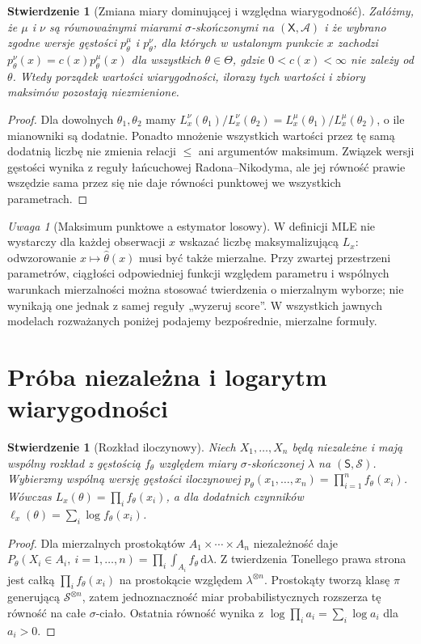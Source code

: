 \documentclass[11pt,a4paper,oneside]{report}
\numberwithin{equation}{chapter}
\theoremstyle{plain}
\newtheorem{stwierdzenie}[twierdzenie]{Stwierdzenie}
\theoremstyle{definition}
\theoremstyle{remark}
\newtheorem{uwaga}{Uwaga}[chapter]
\newcommand{\calA}{\mathcal A}
\newcommand{\dd}{\mathrm d}
\begin{document}
\begin{stwierdzenie}[Zmiana miary dominującej i względna wiarygodność]\label{prop:change-reference}
Załóżmy, że $\mu$ i $\nu$ są równoważnymi miarami $\sigma$-skończonymi na
$(\mathsf X,\calA)$ i że wybrano zgodne wersje gęstości $p_\theta^\mu$
i $p_\theta^\nu$, dla których w ustalonym punkcie $x$ zachodzi
$p_\theta^\nu(x)=c(x)p_\theta^\mu(x)$ dla wszystkich $\theta\in\Theta$,
gdzie $0<c(x)<\infty$ nie zależy od $\theta$. Wtedy porządek wartości
wiarygodności, ilorazy tych wartości i zbiory maksimów pozostają niezmienione.
\end{stwierdzenie}
\begin{proof}
Dla dowolnych $\theta_1,\theta_2$ mamy
$L_x^\nu(\theta_1)/L_x^\nu(\theta_2)
=L_x^\mu(\theta_1)/L_x^\mu(\theta_2)$, o ile mianowniki są dodatnie.
Ponadto mnożenie wszystkich wartości przez tę samą dodatnią liczbę nie
zmienia relacji $\le$ ani argumentów maksimum. Związek wersji gęstości
wynika z reguły łańcuchowej Radona--Nikodyma, ale jej równość prawie
wszędzie sama przez się nie daje równości punktowej we wszystkich parametrach.
\end{proof}


\begin{uwaga}[Maksimum punktowe a estymator losowy]
W definicji MLE nie wystarczy dla każdej obserwacji $x$ wskazać
liczbę maksymalizującą $L_x$: odwzorowanie $x\mapsto\widehat\theta(x)$
musi być także mierzalne. Przy zwartej przestrzeni parametrów,
ciągłości odpowiedniej funkcji względem parametru i wspólnych
warunkach mierzalności można stosować twierdzenia o mierzalnym
wyborze; nie wynikają one jednak z samej reguły „wyzeruj score”.
W wszystkich jawnych modelach rozważanych poniżej podajemy
bezpośrednie, mierzalne formuły.
\end{uwaga}

\section{Próba niezależna i logarytm wiarygodności}
\begin{stwierdzenie}[Rozkład iloczynowy]\label{prop:product-likelihood}
Niech $X_1,\ldots,X_n$ będą niezależne i mają wspólny rozkład z gęstością
$f_\theta$ względem miary $\sigma$-skończonej $\lambda$ na $(\mathsf S,\mathcal S)$.
Wybierzmy wspólną wersję gęstości iloczynowej
$p_\theta(x_1,\ldots,x_n)=\prod_{i=1}^nf_\theta(x_i)$.
Wówczas $L_x(\theta)=\prod_i f_\theta(x_i)$, a dla dodatnich czynników
$\ell_x(\theta)=\sum_i\log f_\theta(x_i)$.
\end{stwierdzenie}
\begin{proof}
Dla mierzalnych prostokątów $A_1\times\cdots\times A_n$ niezależność
daje $P_\theta(X_i\in A_i,\ i=1,\ldots,n)=\prod_i\int_{A_i}f_\theta\,\dd\lambda$.
Z twierdzenia Tonellego prawa strona jest całką $\prod_i f_\theta(x_i)$
na prostokącie względem $\lambda^{\otimes n}$. Prostokąty tworzą klasę
$\pi$ generującą \mbox{$\mathcal S^{\otimes n}$}, zatem jednoznaczność
miar probabilistycznych rozszerza tę równość na całe $\sigma$-ciało.
Ostatnia równość wynika z $\log\prod_i a_i=\sum_i\log a_i$ dla $a_i>0$.
\end{proof}
\end{document}

